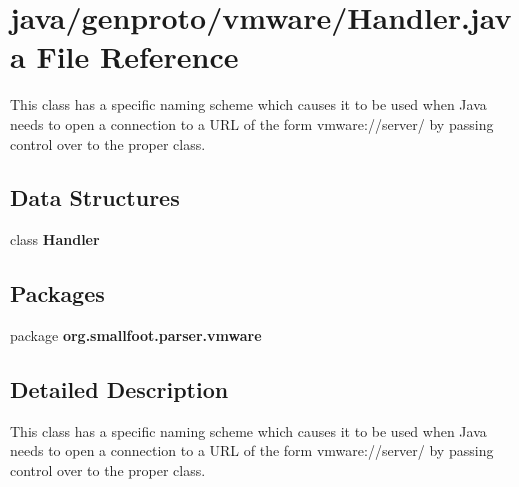 \section{java/genproto/vmware/\+Handler.java File Reference}
\label{vmware_2Handler_8java}


This class has a specific naming scheme which causes it to be used when Java needs to open a connection to a U\+R\+L of the form vmware\+://server/ by passing control over to the proper class.  


\subsection*{Data Structures}
\begin{DoxyCompactItemize}
\item 
class {\bf Handler}
\end{DoxyCompactItemize}
\subsection*{Packages}
\begin{DoxyCompactItemize}
\item 
package {\bf org.\+smallfoot.\+parser.\+vmware}
\end{DoxyCompactItemize}


\subsection{Detailed Description}
This class has a specific naming scheme which causes it to be used when Java needs to open a connection to a U\+R\+L of the form vmware\+://server/ by passing control over to the proper class. 

